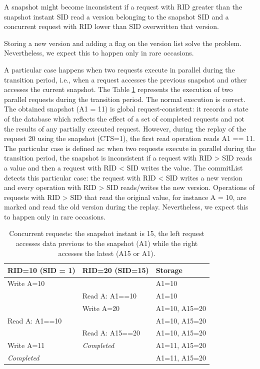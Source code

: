 A snapshot might become inconsistent if a request with \ac{RID} greater than the snapshot instant \ac{SID} read a version belonging to the snapshot \ac{SID} and a concurrent request with \ac{RID} lower than \ac{SID} overwritten that version. 

Storing a new version and adding a flag on the version list solve the problem. Nevertheless, we expect this to happen only in rare occasions.

A particular case happens when two requests execute in parallel during the transition period, i.e., when a request accesses the previous snapshot and other accesses the current snapshot. The Table \ref{tab:snapshot_caso_bicudo} represents the execution of two parallel requests during the transition period. The normal execution is correct. The obtained snapshot (A1 = 11) is global request-consistent: it records a state of the database which reflects the effect of a set of completed requests and not the results of any partially executed request. However, during the replay of the request 20 using the snapshot (CTS=1), the first read operation reads A1 == 11. The particular case is defined as: when two requests execute in parallel during the transition period, the snapshot is inconsistent if a request with \ac{RID} > \ac{SID} reads a value and then a request with \ac{RID} < \ac{SID} writes the value. The commitList detects this particular case: the request with \ac{RID} < \ac{SID} writes a new version and every operation with \ac{RID} > \ac{SID} reads/writes the new version. Operations of requests with \ac{RID} > \ac{SID} that read the original value, for instance A = 10, are marked and read the old version during the replay. Nevertheless, we expect this to happen only in rare occasions. 
\begin{table}
\centering
\begin{tabular}{l|l|l}
\textbf{RID=10 (SID = 1)}     & \textbf{RID=20 (SID=15)}   & \textbf{Storage}\\ \hline
Write A=10                    & ~                          & A1=10  \\
~                             & Read A: A1==10             & A1=10  \\         
~                             & Write A=20                 & A1=10, A15=20 \\
Read A: A1==10                & ~                          & A1=10, A15=20 \\
~                             & Read A: A15==20            & A1=10, A15=20 \\
Write A=11                    & \textit{Completed}         & A1=11, A15=20 \\
\textit{Completed}            & ~                          & A1=11, A15=20 \\
\end{tabular}
\caption[Concurrent requests]{Concurrent requests: the snapshot instant is 15, the left request accesses data previous to the snapshot (A1) while the right accesses the latest (A15 or A1). }
\label{tab:snapshot_caso_bicudo}
\end{table}


